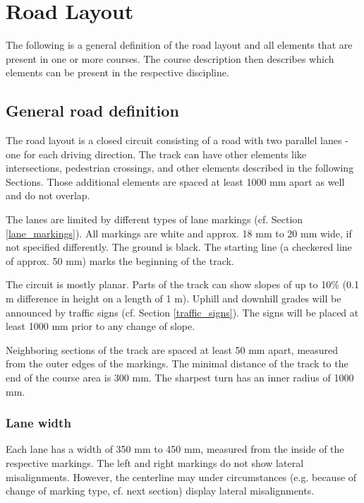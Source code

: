 \section{Road Layout}

The following is a general definition of the road layout and all elements that are present in one or more courses. 
The course description then describes which elements can be present in the respective discipline. 


\subsection{General road definition}

The road layout is a closed circuit consisting of a road with two parallel lanes - one for each driving direction.
The track can have other elements like intersections, pedestrian crossings, and other elements described in the following Sections.
Those additional elements are spaced at least 1000 mm apart as well and do not overlap.

The lanes are limited by different types of lane markings (cf. Section \ref{lane_markings}).
All markings are white and approx. 18 mm to 20 mm wide, if not specified differently. The ground is black.
The starting line (a checkered line of approx. 50 mm) marks the beginning of the track.

The circuit is mostly planar.
Parts of the track can show slopes of up to 10\% (0.1 m difference in height on a length of 1 m).
Uphill and downhill grades will be announced by traffic signs (cf. Section \ref{traffic_signs}).
The signs will be placed at least 1000 mm prior to any change of slope.

Neighboring sections of the track are spaced at least 50 mm apart, measured from the outer edges of the markings.
The minimal distance of the track to the end of the course area is 300 mm.
The sharpest turn has an inner radius of 1000 mm.

\subsubsection{Lane width}
\label{lane_width}

Each lane has a width of 350 mm to 450 mm, measured from the inside of the respective markings.
The left and right markings do not show lateral misalignments.
However, the centerline may under circumstances (e.g. because of change of marking type, cf. next section) display lateral misalignments.


